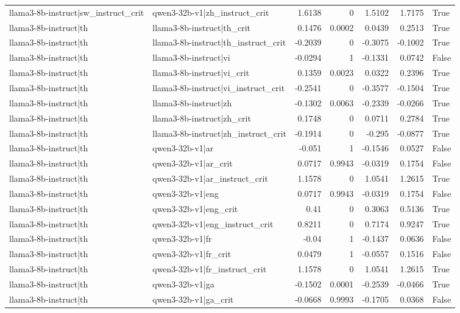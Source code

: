 \begin{table}
\begin{tabular}{l l r r r r l}
llama3-8b-instruct|sw_instruct_crit & qwen3-32b-v1|zh_instruct_crit & 1.6138 & 0 & 1.5102 & 1.7175 & True \\
llama3-8b-instruct|th & llama3-8b-instruct|th_crit & 0.1476 & 0.0002 & 0.0439 & 0.2513 & True \\
llama3-8b-instruct|th & llama3-8b-instruct|th_instruct_crit & -0.2039 & 0 & -0.3075 & -0.1002 & True \\
llama3-8b-instruct|th & llama3-8b-instruct|vi & -0.0294 & 1 & -0.1331 & 0.0742 & False \\
llama3-8b-instruct|th & llama3-8b-instruct|vi_crit & 0.1359 & 0.0023 & 0.0322 & 0.2396 & True \\
llama3-8b-instruct|th & llama3-8b-instruct|vi_instruct_crit & -0.2541 & 0 & -0.3577 & -0.1504 & True \\
llama3-8b-instruct|th & llama3-8b-instruct|zh & -0.1302 & 0.0063 & -0.2339 & -0.0266 & True \\
llama3-8b-instruct|th & llama3-8b-instruct|zh_crit & 0.1748 & 0 & 0.0711 & 0.2784 & True \\
llama3-8b-instruct|th & llama3-8b-instruct|zh_instruct_crit & -0.1914 & 0 & -0.295 & -0.0877 & True \\
llama3-8b-instruct|th & qwen3-32b-v1|ar & -0.051 & 1 & -0.1546 & 0.0527 & False \\
llama3-8b-instruct|th & qwen3-32b-v1|ar_crit & 0.0717 & 0.9943 & -0.0319 & 0.1754 & False \\
llama3-8b-instruct|th & qwen3-32b-v1|ar_instruct_crit & 1.1578 & 0 & 1.0541 & 1.2615 & True \\
llama3-8b-instruct|th & qwen3-32b-v1|eng & 0.0717 & 0.9943 & -0.0319 & 0.1754 & False \\
llama3-8b-instruct|th & qwen3-32b-v1|eng_crit & 0.41 & 0 & 0.3063 & 0.5136 & True \\
llama3-8b-instruct|th & qwen3-32b-v1|eng_instruct_crit & 0.8211 & 0 & 0.7174 & 0.9247 & True \\
llama3-8b-instruct|th & qwen3-32b-v1|fr & -0.04 & 1 & -0.1437 & 0.0636 & False \\
llama3-8b-instruct|th & qwen3-32b-v1|fr_crit & 0.0479 & 1 & -0.0557 & 0.1516 & False \\
llama3-8b-instruct|th & qwen3-32b-v1|fr_instruct_crit & 1.1578 & 0 & 1.0541 & 1.2615 & True \\
llama3-8b-instruct|th & qwen3-32b-v1|ga & -0.1502 & 0.0001 & -0.2539 & -0.0466 & True \\
llama3-8b-instruct|th & qwen3-32b-v1|ga_crit & -0.0668 & 0.9993 & -0.1705 & 0.0368 & False \\

\end{tabular}
\end{table}
